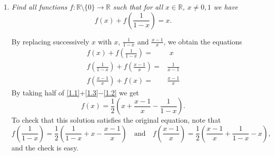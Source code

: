 \documentclass{article}
\begin{document}
\begin{enumerate}[1.]
\vspace{24pt}
\item %
{\itshape Find all functions $f:\mathbb{R}\setminus\{0\}\to\mathbb{R}$ such that for all $x\in\mathbb{R}$, $x\ne 0,1$ we have
	$$f(x)+f\left(\frac{1}{1-x}\right)=x.$$}

By replacing successively $x$ with $x$, $\frac{1}{1-x}$ and $\frac{x-1}{x}$, we obtain the equations
	\begin{align}
	  f(x)+f\left(\frac{1}{1-x}\right)=&\,\,x\label{1.1}\\
		f\left(\frac{1}{1-x}\right)+f\left(\frac{x-1}{x}\right)=&\frac{1}{x-1}\label{1.2}\\
		f\left(\frac{x-1}{x}\right)+f(x)=&\frac{x-1}{x}\label{1.3}
	\end{align}
	By taking half of \eqref{1.1}+\eqref{1.3}$-$\eqref{1.2} we get
	$$f(x)=\frac{1}{2}\left(x+\frac{x-1}{x}-\frac{1}{1-x}\right).$$
	To check that this solution satisfies the original equation, note that
	$$f\left(\frac{1}{1-x}\right)=\frac{1}{2}\left(\frac{1}{1-x}+x-\frac{x-1}{x}\right)\quad\text{and}\quad f\left(\frac{x-1}{x}\right)=\frac{1}{2}\left(\frac{x-1}{x}+\frac{1}{1-x}-x\right),$$
	and the check is easy.

\end{enumerate}
\end{document}
